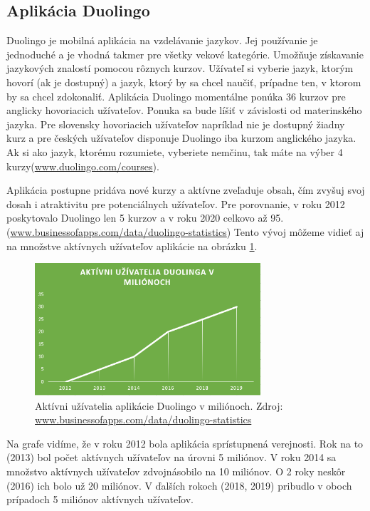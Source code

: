 \documentclass[10pt,oneside,slovak,a4paper]{article}
\begin{document}
\subsection{Aplikácia Duolingo}%
Duolingo je mobilná aplikácia na vzdelávanie jazykov. Jej používanie je jednoduché a je vhodná takmer pre všetky vekové kategórie\cite{duolingo}. Umožňuje získavanie jazykových znalostí pomocou rôznych kurzov. Užívateľ si vyberie jazyk, ktorým hovorí (ak je dostupný) a jazyk, ktorý by sa chcel naučiť, prípadne ten, v ktorom by sa chcel zdokonaliť. Aplikácia Duolingo momentálne ponúka 36 kurzov pre anglicky hovoriacich užívateľov. Ponuka sa bude líšiť v závislosti od materinského jazyka. Pre slovensky hovoriacich užívateľov napríklad nie je dostupný žiadny kurz a pre českých užívateľov disponuje Duolingo iba kurzom anglického jazyka. Ak si ako jazyk, ktorému rozumiete, vyberiete nemčinu, tak máte na výber 4 kurzy(\href{https://www.duolingo.com/courses}{www.duolingo.com/courses}).

Aplikácia postupne pridáva nové kurzy a aktívne zveľaduje obsah, čím zvyšuj svoj dosah i atraktivitu pre potenciálnych užívateľov. Pre porovnanie, v roku 2012 poskytovalo Duolingo len 5 kurzov a v roku 2020 celkovo až 95. (\href{https://www.businessofapps.com/data/duolingo-statistics/}{www.businessofapps.com/data/duolingo-statistics}) Tento vývoj môžeme vidieť aj na množstve aktívnych užívateľov aplikácie na obrázku \ref{duo-uzivatelia}.

\begin{figure}[h] %
\centering
\includegraphics[width=0.75\textwidth,height=0.3\textheight]{duolingo.png}
\caption{ Aktívni užívatelia aplikácie Duolingo v miliónoch.
Zdroj: \href{https://www.businessofapps.com/data/duolingo-statistics/}{www.businessofapps.com/data/duolingo-statistics}}
\label{duo-uzivatelia}
\end{figure}

Na grafe vidíme, že v roku 2012 bola aplikácia sprístupnená verejnosti. Rok na to (2013) bol počet aktívnych užívateľov na úrovni 5 miliónov. V roku 2014 sa množstvo aktívnych užívateľov zdvojnásobilo na 10 miliónov. O 2 roky neskôr (2016) ich bolo už 20 miliónov. V ďalších rokoch (2018, 2019) pribudlo v oboch prípadoch 5 miliónov aktívnych užívateľov.
\end{document}
